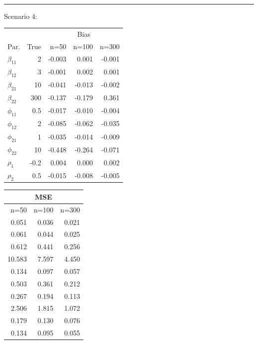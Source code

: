 \documentclass[useAMS,referee]{biom}
\begin{document}
\begin{table}[!h]
\begin{minipage}[b]{.1\textwidth}
\begin{tabular}{rrr}
\end{tabular}
\end{minipage}
\\\hrule\vspace{0.2cm}
Scenario 4:\\
\begin{minipage}[b]{.43\textwidth}
\begin{tabular}{lrrrr} 
	& &   \multicolumn{3}{c}{Bias}  \\ 
	\cmidrule{3-5}
	Par.	&  True & n=50 & n=100 & n=300   \\ 			\midrule 
	$\beta_{11}$ &	2&-0.003&	0.001&	-0.001\\
	$\beta_{12}$ &	3&-0.001&	0.002&	0.001\\
	$\beta_{21}$&10& -0.041&	-0.013&	-0.002\\
	$\beta_{22}$&300&-0.137&	-0.179&	0.361\\
	$\phi_{11}$	&0.5&-0.017&	-0.010&	-0.004\\
	$\phi_{12}$&2&-0.085&	-0.062&	-0.035\\
	$\phi_{21}$	&1&-0.035&	-0.014&	-0.009\\
	$\phi_{22}$	&10&-0.448&	-0.264&	-0.071\\
	$\rho_1$	&-0.2&0.004&	0.000&	0.002\\
	$\rho_2$&	0.5	&-0.015&	-0.008&	-0.005\\
	\hline
\end{tabular}
\end{minipage}
\begin{minipage}[b]{.28\textwidth}
\begin{tabular}{rrr} 
	& \multicolumn{1}{c}{MSE}  &\\
	\hline
	n=50 & n=100 & n=300   \\ 	
	\midrule 
	0.051&	0.036&	0.021\\
	0.061&	0.044&	0.025\\
	0.612&	0.441&	0.256\\
	10.583&	7.597&	4.450\\
	0.134&	0.097&	0.057\\
	0.503&	0.361&	0.212\\
	0.267&	0.194&	0.113\\
	2.506&	1.815&	1.072\\
	0.179&	0.130&	0.076\\
	0.134&	0.095&	0.055\\	
	\hline
\end{tabular}
\end{minipage}
\begin{minipage}[b]{.1\textwidth}	

\end{minipage}
\end{table}
\end{document}
